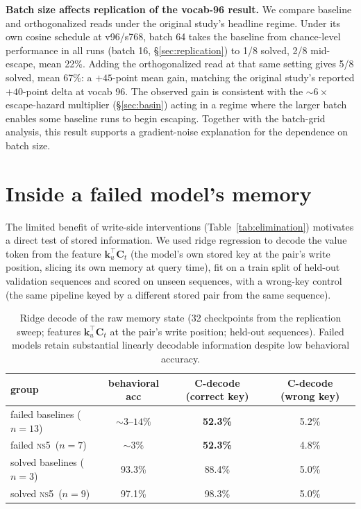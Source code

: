 \documentclass[11pt]{article}
\newcommand{\C}{\mathbf{C}}
\newcommand{\kk}{\mathbf{k}}
\newcommand{\ns}{\textsc{ns5}}
\begin{document}
\textbf{Batch size affects replication of the vocab-96 result.} We compare
baseline and orthogonalized reads under the original study's headline regime. Under its
own cosine schedule at v96/s768, batch 64 takes the baseline from
chance-level performance in all runs (batch 16, \S\ref{sec:replication}) to 1/8 solved, 2/8
mid-escape, mean 22\%. Adding the orthogonalized read at that same setting gives
5/8 solved, mean 67\%: a $+45$-point mean gain, matching the original study's
reported $+40$-point delta at vocab 96. The observed gain is consistent with the
${\sim}6\times$ escape-hazard multiplier (\S\ref{sec:basin}) acting in a regime
where the larger batch enables some baseline runs to begin escaping. Together
with the batch-grid analysis, this result supports a gradient-noise explanation
for the dependence on batch size.

\section{Inside a failed model's memory}
\label{sec:decode}

The limited benefit of write-side interventions (Table~\ref{tab:elimination})
motivates a direct test of stored information. We used ridge regression to decode
the value
token from the feature $\kk_u^{\!\top}\C_t$ (the model's own stored key
at the pair's write position, slicing its own memory at query time),
fit on a train split of held-out validation sequences and scored on unseen
sequences, with a wrong-key control (the same pipeline keyed by a different stored
pair from the same sequence).

\begin{table}[h]
\centering
\small
\begin{tabular}{lccc}
\toprule
group & behavioral acc & $\C$-decode (correct key) & $\C$-decode (wrong key) \\
\midrule
failed baselines ($n{=}13$) & ${\sim}3$--$14\%$ & \textbf{52.3\%} & 5.2\% \\
failed \ns\ ($n{=}7$)       & ${\sim}3\%$       & \textbf{52.3\%} & 4.8\% \\
solved baselines ($n{=}3$)  & 93.3\%            & 88.4\%          & 5.0\% \\
solved \ns\ ($n{=}9$)       & 97.1\%            & 98.3\%          & 5.0\% \\
\bottomrule
\end{tabular}
\caption{Ridge decode of the raw memory state (32 checkpoints from the
replication sweep; features $\kk_u^{\!\top}\C_t$ at the pair's write position;
held-out sequences). Failed models retain substantial linearly decodable information despite low
behavioral accuracy.}
\label{tab:decode}
\end{table}
\end{document}
